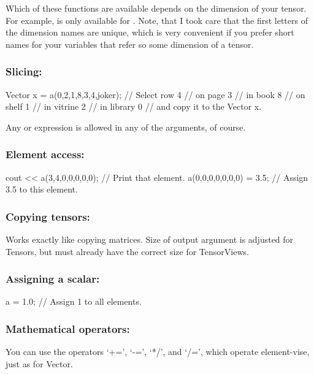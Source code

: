Which of these functions are available depends on the dimension of
your tensor. For example,  is only available for
. Note, that I took care that the first letters of the
dimension names are unique, which is very convenient if you prefer short
names for your variables that refer so some dimension of a tensor.

\subsubsection{Slicing:}
\begin{code}
Vector x = a(0,2,1,8,3,4,joker);
// Select row 4
// on page 3 
// in book 8
// on shelf 1 
// in vitrine 2 
// in library 0
// and copy it to the Vector x.
\end{code}

Any  or  expression is allowed in any of the
arguments, of course.

\subsubsection{Element access:}
\begin{code}
cout << a(3,4,0,0,0,0,0); // Print that element.
a(0,0,0,0,0,0,0) = 3.5;   // Assign 3.5 to this element.
\end{code}

\subsubsection{Copying tensors:}

Works exactly like copying matrices. Size of output argument is
adjusted for Tensors, but must already have the correct size for
TensorViews.

\subsubsection{Assigning a scalar:}
\begin{code}
a = 1.0;                        // Assign 1 to all elements.
\end{code}

\subsubsection{Mathematical operators:}

You can use the operators `+=', `-=', `*/', and `/=', which operate
element-vise, just as for Vector.

